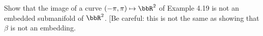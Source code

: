 Show that the image of a curve $(-\pi, \pi) \mapsto \bbR^2$ of Example 4.19 is not an embedded submanifold of $\bbR^2$.  [Be careful: this is not the same as showing that $\beta$ is not an embedding.